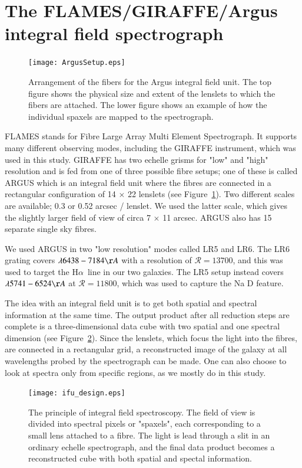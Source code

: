 \documentclass[a4wide,12pt]{book}
\newcommand{\ha}{H${\alpha}$}
\begin{document}
{\section{The FLAMES/GIRAFFE/Argus integral field spectrograph}


\begin{figure}
   \centering
   \texttt{[image: ArgusSetup.eps]}
   \caption{Arrangement of the fibers for the Argus integral field unit. The top figure shows the physical size and extent of the lenslets to which the fibers are attached. The lower figure shows an example of how the individual spaxels are mapped to the spectrograph. }
              \label{Fig:ArgusSetup}
    \end{figure}

FLAMES stands for Fibre Large Array Multi Element Spectrograph. It supports many different observing modes, including the GIRAFFE instrument, which was used in this study. GIRAFFE has two echelle grisms for "low" and "high" resolution and is fed from one of three possible fibre setups; one of these is called ARGUS which is an integral field unit where the fibres are connected in a rectangular configuration of 14 $\times$ 22 lenslets (see Figure~\ref{Fig:ArgusSetup}). Two different scales are available; 0.3 or 0.52 arcsec / lenslet. We used the latter scale, which gives the slightly larger field of view of circa 7 $\times$ 11 arcsec. ARGUS also has 15 separate single sky fibres. 

We used ARGUS in two "low resolution" modes called LR5 and LR6. The LR6 grating covers $\lambda 6438-7184 \AA$ with a resolution of $\mathcal{R} = 13700$, and this was used to target the \ha\ line in our two galaxies. The LR5 setup instead covers $\lambda 5741-6524 \AA$ at $\mathcal{R} = 11800$, which was used to capture the Na D feature. 

The idea with an integral field unit is to get both spatial and spectral information at the same time. The output product after all reduction steps are complete is a three-dimensional data cube with two spatial and one spectral dimension (see Figure~\ref{Fig:ifu_design}). Since the lenslets, which focus the light into the fibres, are connected in a rectangular grid, a reconstructed image of the galaxy at all wavelengths probed by the spectrograph can be made. One can also choose to look at spectra only from specific regions, as we mostly do in this study. 

\begin{figure}
   \centering
   \texttt{[image: ifu\_design.eps]}
   \caption{The principle of integral field spectroscopy. The field of view is divided into spectral pixels or "spaxels", each corresponding to a small lens attached to a fibre. The light is lead through a slit in an ordinary echelle spectrograph, and the final data product becomes a reconstructed cube with both spatial and spectal information.}
              \label{Fig:ifu_design}
    \end{figure}

}
\end{document}

